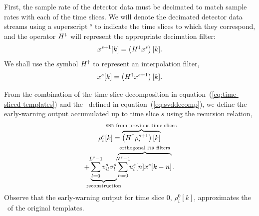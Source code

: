 First, the sample rate of the detector data must be decimated to match sample rates
with each of the time slices.  We will denote the decimated detector data streams using
a superscript $^s$ to indicate the time slices to which they correspond, and the
operator $H^\shortdownarrow$ will represent the appropriate decimation filter:
\begin{equation*}
\label{eq:decomp}
	x^{s+1}[k] = \left( H^\shortdownarrow x^s\right)[k].
\end{equation*}
We shall use the symbol $H^\shortuparrow$ to represent an interpolation filter,
\begin{equation*}
	x^{s}[k] = \left( H^\shortuparrow x^{s+1}\right)[k].
\end{equation*}

From the combination of the time slice decomposition in
equation~(\ref{eq:time-sliced-templates}) and the \SVD\ defined in
equation~(\ref{eq:svddecomp}), we define the early-warning output accumulated
up to time slice $s$ using the recursion relation,
%
%
\begin{multline}
	\rho_i^s [k] =%
		\overbrace{
			\left(H^\uparrow \rho_i^{s+1}\right)[k]
		}^\textrm{\clap{{\sc snr} from previous time slices}} \\
		+
		\underbrace{
			\sum_{\mathclap{l=0}}^{\mathclap{L^s-1}} v_{il}^s \sigma_l^s
		}_\textrm{\clap{reconstruction}}
		\overbrace{
			\sum_{\mathclap{n=0}}^{\mathclap{N^s-1}} u_l^s[n] x^s[k-n]
		}^\textrm{\clap{orthogonal {\sc fir} filters}} .
\end{multline}
%
%
Observe that the early-warning output for time slice 0, $\rho_i^0[k]$,
approximates the \SNR\ of the original templates.
%
%
